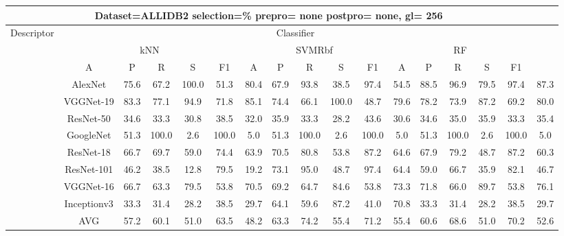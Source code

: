 \documentclass[12pt,italian]{article}
\begin{document}
\begin{tiny}
\begin{longtable}{lcccccccccccccccc}
\toprule
\multicolumn{16}{c}{Dataset=ALLIDB2 selection=\% prepro= none postpro= none, gl= 256} \\ 
\toprule
Descriptor & \multicolumn{15}{c}{Classifier} \\ 
& \multicolumn{5}{c}{kNN} & \multicolumn{5}{c}{SVMRbf} & \multicolumn{5}{c}{RF} \\ 
& A & P & R & S & F1 & A & P & R & S & F1 & A & P & R & S & F1 \\ 
\midrule
& AlexNet & 75.6 & 67.2 & 100.0 & 51.3 & 80.4 & 67.9 & 93.8 & 38.5 & 97.4 & 54.5 & 88.5 & 96.9 & 79.5 & 97.4 & 87.3 \\ 
& VGGNet-19 & 83.3 & 77.1 & 94.9 & 71.8 & 85.1 & 74.4 & 66.1 & 100.0 & 48.7 & 79.6 & 78.2 & 73.9 & 87.2 & 69.2 & 80.0 \\ 
& ResNet-50 & 34.6 & 33.3 & 30.8 & 38.5 & 32.0 & 35.9 & 33.3 & 28.2 & 43.6 & 30.6 & 34.6 & 35.0 & 35.9 & 33.3 & 35.4 \\ 
& GoogleNet & 51.3 & 100.0 &  2.6 & 100.0 &  5.0 & 51.3 & 100.0 &  2.6 & 100.0 &  5.0 & 51.3 & 100.0 &  2.6 & 100.0 &  5.0 \\ 
& ResNet-18 & 66.7 & 69.7 & 59.0 & 74.4 & 63.9 & 70.5 & 80.8 & 53.8 & 87.2 & 64.6 & 67.9 & 79.2 & 48.7 & 87.2 & 60.3 \\ 
& ResNet-101 & 46.2 & 38.5 & 12.8 & 79.5 & 19.2 & 73.1 & 95.0 & 48.7 & 97.4 & 64.4 & 59.0 & 66.7 & 35.9 & 82.1 & 46.7 \\ 
& VGGNet-16 & 66.7 & 63.3 & 79.5 & 53.8 & 70.5 & 69.2 & 64.7 & 84.6 & 53.8 & 73.3 & 71.8 & 66.0 & 89.7 & 53.8 & 76.1 \\ 
& Inceptionv3 & 33.3 & 31.4 & 28.2 & 38.5 & 29.7 & 64.1 & 59.6 & 87.2 & 41.0 & 70.8 & 33.3 & 31.4 & 28.2 & 38.5 & 29.7 \\ 
\hline
& AVG & 57.2 & 60.1 & 51.0 & 63.5 & 48.2 & 63.3 & 74.2 & 55.4 & 71.2 & 55.4 & 60.6 & 68.6 & 51.0 & 70.2 & 52.6 \\ 
\hline
\bottomrule
\end{longtable} 

 \pagebreak 
\end{tiny} 
 
\end{document}
